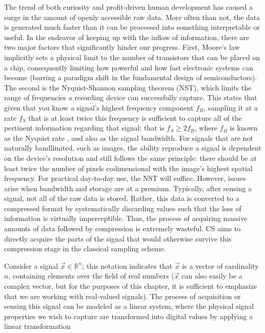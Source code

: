 The trend of both curiosity and profit-driven human development has caused a
surge in the amount of openly accessible raw data. More often than not, the data is generated much faster than it can be processed into something interpretable or useful. In the endeavor of keeping up with the inflow of information, there are two major factors that significantly hinder our progress. First, Moore’s law implicitly sets a physical limit to the number of transistors that can be placed on a chip, consequently limiting how powerful and how fast electronic systems can become (barring a paradigm shift in the fundamental design of semiconductors). The second is the Nyquist-Shannon sampling theorem (NST), which limits the range of frequencies a recording device can successfully capture. This states that given that you know a signal's highest frequency component $f_B$, sampling it at a rate $f_S$ that is at least twice this frequency is sufficient to capture all of the pertinent information regarding that signal: that is $f_S \geq 2f_B$, where $f_B$ is known as the Nyquist rate \cite{Shannon1949}, and also as the signal bandwidth. For signals that are not naturally bandlimited, such as images, the ability reproduce a signal is dependent on the device's resolution and still follows the same principle: there should be at least twice the number of pixels codimensional with the image's highest spatial frequency. For practical day-to-day use, the NST will suffice. However, issues arise when bandwidth and storage are at a premium. Typically, after sensing a signal, not all of the raw data is stored. Rather, this data is converted to a compressed format by systematically discarding values such that the loss of information is virtually imperceptible. Thus, the process of acquiring massive amounts of data followed by compression is extremely wasteful. CS aims to directly acquire the parts of the signal that would otherwise survive this compression stage in the classical sampling scheme.

Consider a signal $\vec{x} \in \mathbb{R}^{n}$; this notation indicates that $\vec{x}$ is a vector of cardinality $n$, containing elements over the field of real numbers ($\vec{x}$ can also easily be a complex vector, but for the purposes of this chapter, it is sufficient to emphasize that we are working with real-valued signals). The process of acquisition or sensing this signal can be modeled as a linear system, where the physical signal properties we wish to capture are transformed into digital values by applying a linear transformation

